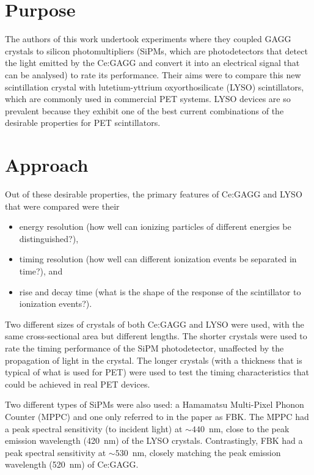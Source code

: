 \documentclass[12pt,a4paper]{article}
\begin{document}
\section*{Purpose}
The authors of this work undertook experiments where they coupled GAGG crystals to silicon photomultipliers (SiPMs, which are photodetectors that detect the light emitted by the Ce:GAGG and convert it into an electrical signal that can be analysed) to rate its performance. Their aims were to compare this new scintillation crystal with lutetium-yttrium oxyorthosilicate (LYSO) scintillators, which are commonly used in commercial PET systems. LYSO devices are so prevalent because they exhibit one of the best current combinations of the desirable properties for PET scintillators.

\section*{Approach}
Out of these desirable properties, the primary features of Ce:GAGG and LYSO that were compared were their
\begin{itemize}
\item energy resolution (how well can ionizing particles of different energies be distinguished?),
\item timing resolution (how well can different ionization events be separated in time?), and
\item rise and decay time (what is the shape of the response of the scintillator to ionization events?).
\end{itemize}
Two different sizes of crystals of both Ce:GAGG and LYSO were used, with the same cross-sectional area but different lengths. The shorter crystals were used to rate the timing performance of the SiPM photodetector, unaffected by the propagation of light in the crystal. The longer crystals (with a thickness that is typical of what is used for PET) were used to test the timing characteristics that could be achieved in real PET devices.

\medskip
Two different types of SiPMs were also used: a Hamamatsu Multi-Pixel Phonon Counter (MPPC) and one only referred to in the paper as FBK. The MPPC had a peak spectral sensitivity (to incident light) at $\sim440$~nm, close to the peak emission wavelength (420~nm) of the LYSO crystals. Contrastingly, FBK had a peak spectral sensitivity at $\sim530$~nm, closely matching the peak emission wavelength (520~nm) of Ce:GAGG.
\end{document}
